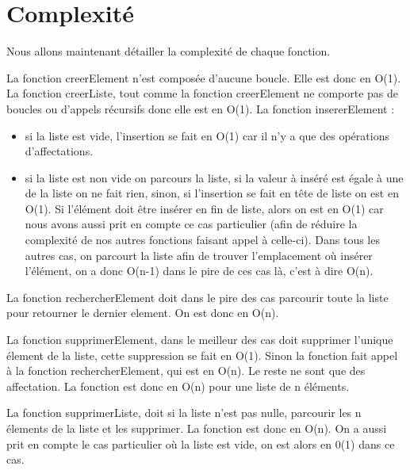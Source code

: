 \documentclass[11pt]{report}
\begin{document}
\section{Complexité}

Nous allons maintenant détailler la complexité de chaque fonction.

\medskip

La fonction creerElement n'est composée d'aucune boucle. Elle est donc en O(1).
\medskip
La fonction creerListe, tout comme la fonction creerElement ne comporte pas de boucles ou d'appels récursifs donc elle est en O(1).
\medskip
La fonction insererElement :
\begin{itemize}
	\item si la liste est vide, l'insertion se fait en O(1) car il n'y a que des opérations d'affectations.
	\item si la liste est non vide on parcours la liste, si la valeur à inséré est égale à une de la liste on ne fait rien, sinon, si l'insertion se fait en tête de liste on est en O(1). Si l'élément doit être insérer en fin de liste, alors on est en O(1) car nous avons aussi prit en compte ce cas particulier (afin de réduire la complexité de nos autres fonctions faisant appel à celle-ci). Dans tous les autres cas, on parcourt la liste afin de trouver l'emplacement où insérer l'élément, on a donc O(n-1) dans le pire de ces cas là, c'est à dire O(n).
	
\end{itemize}


\medskip

La fonction rechercherElement doit dans le pire des cas parcourir toute la liste pour retourner le dernier element. On est donc en O(n).

\medskip

La fonction supprimerElement, dans le meilleur des cas doit supprimer l'unique élement de la liste, cette suppression se fait en O(1). Sinon la fonction fait appel à la fonction rechercherElement, qui est en O(n). Le reste ne sont que des affectation. La fonction est donc en O(n) pour une liste de n éléments.

\medskip

La fonction supprimerListe, doit si la liste n'est pas nulle, parcourir les n élements de la liste et les supprimer. La fonction est donc en O(n). On a aussi prit en compte le cas particulier où la liste est vide, on est alors en 0(1) dans ce cas.   

\medskip
\end{document}
